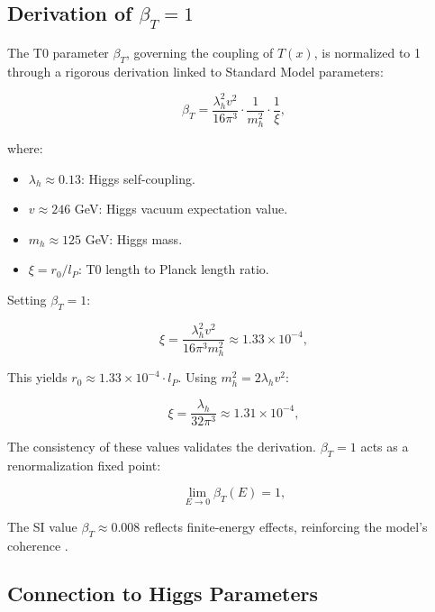 \documentclass[twocolumn,aps,prl]{revtex4-2}
\begin{document}
	\subsection{Derivation of $\beta_T = 1$}
	\label{subsec:beta_derivation}
	
	The T0 parameter $\beta_T$, governing the coupling of $T(x)$, is normalized to 1 through a rigorous derivation linked to Standard Model parameters:
	
	\begin{equation}
		\beta_T = \frac{\lambda_h^2 v^2}{16 \pi^3} \cdot \frac{1}{m_h^2} \cdot \frac{1}{\xi}, \label{eq:beta_derivation}
	\end{equation}
	
	where:
	\begin{itemize}
		\item $\lambda_h \approx 0.13$: Higgs self-coupling.
		\item $v \approx 246$ GeV: Higgs vacuum expectation value.
		\item $m_h \approx 125$ GeV: Higgs mass.
		\item $\xi = r_0/l_P$: T0 length to Planck length ratio.
	\end{itemize}
	
	Setting $\beta_T = 1$:
	
	\begin{equation}
		\xi = \frac{\lambda_h^2 v^2}{16 \pi^3 m_h^2} \approx 1.33 \times 10^{-4}, \label{eq:xi_value}
	\end{equation}
	
	This yields $r_0 \approx 1.33 \times 10^{-4} \cdot l_P$. Using $m_h^2 = 2 \lambda_h v^2$:
	
	\begin{equation}
		\xi = \frac{\lambda_h}{32 \pi^3} \approx 1.31 \times 10^{-4}, \label{eq:xi_alt}
	\end{equation}
	
	The consistency of these values validates the derivation. $\beta_T = 1$ acts as a renormalization fixed point:
	
	\begin{equation}
		\lim_{E \to 0} \beta_T(E) = 1, \label{eq:beta_limit}
	\end{equation}
	
	The SI value $\beta_T \approx 0.008$ reflects finite-energy effects, reinforcing the model's coherence \cite{pascher_beta_2025}.
	
	\subsection{Connection to Higgs Parameters}
	\label{subsec:higgs}
	
\end{document}
